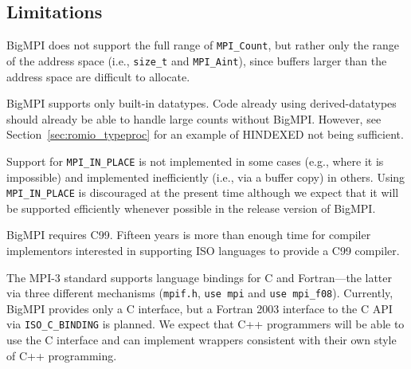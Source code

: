 
\subsection{Limitations}

BigMPI does not support the full
range of \texttt{MPI\_Count}, but rather only the range of the
address space (i.e., \texttt{size\_t} and \texttt{MPI\_Aint}), since buffers
larger than the address space are difficult to allocate.

BigMPI supports  only  built-in datatypes.  
Code already using derived-datatypes should already be able 
to handle large counts without BigMPI\@.
However, see Section~\ref{sec:romio_typeproc} 
for an example of HINDEXED not being sufficient.

Support for \texttt{MPI\_IN\_PLACE} is not 
implemented in some cases (e.g., where it is impossible) and 
implemented inefficiently (i.e., via a buffer copy) in others.
Using \texttt{MPI\_IN\_PLACE} is discouraged at the present time
although we expect that it will be supported efficiently whenever
possible in the release version of BigMPI.

BigMPI requires C99.  Fifteen years is more than enough time for compiler 
implementors interested in supporting ISO languages to provide a C99
compiler.

The MPI-3 standard supports language bindings for C and
Fortran---the latter via three different mechanisms
(\texttt{mpif.h}, \texttt{use mpi} and \texttt{use mpi\_f08}).
Currently, BigMPI provides only a C interface, but a Fortran 2003
interface to the C API via \texttt{ISO\_C\_BINDING} is planned.
We expect that C++ programmers will be able to use the
C interface and can implement wrappers consistent with their own
style of C++ programming.
